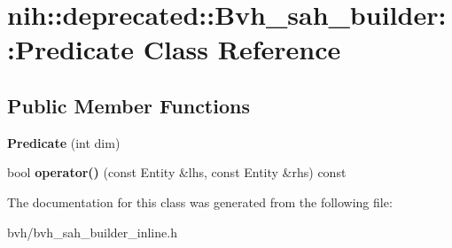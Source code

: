 \hypertarget{classnih_1_1deprecated_1_1_bvh__sah__builder_1_1_predicate}{
\section{nih\-:\-:deprecated\-:\-:\-Bvh\-\_\-sah\-\_\-builder\-:\-:\-Predicate \-Class \-Reference}
\label{classnih_1_1deprecated_1_1_bvh__sah__builder_1_1_predicate}
}
\subsection*{\-Public \-Member \-Functions}
\begin{DoxyCompactItemize}
\item 
\hypertarget{classnih_1_1deprecated_1_1_bvh__sah__builder_1_1_predicate_a13d223f7a771a571bf5b97b341c250c9}{
{\bfseries \-Predicate} (int dim)}
\label{classnih_1_1deprecated_1_1_bvh__sah__builder_1_1_predicate_a13d223f7a771a571bf5b97b341c250c9}

\item 
\hypertarget{classnih_1_1deprecated_1_1_bvh__sah__builder_1_1_predicate_aade67c097ee4dbf3c83890e0cab9d067}{
bool {\bfseries operator()} (const \-Entity \&lhs, const \-Entity \&rhs) const }
\label{classnih_1_1deprecated_1_1_bvh__sah__builder_1_1_predicate_aade67c097ee4dbf3c83890e0cab9d067}

\end{DoxyCompactItemize}


\-The documentation for this class was generated from the following file\-:\begin{DoxyCompactItemize}
\item 
bvh/bvh\-\_\-sah\-\_\-builder\-\_\-inline.\-h\end{DoxyCompactItemize}
